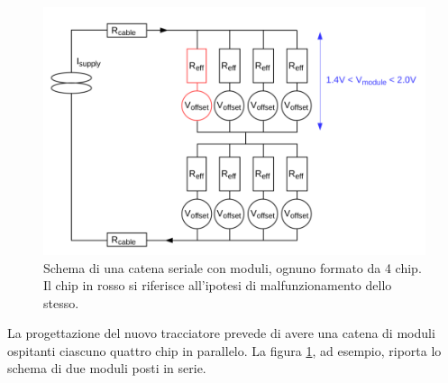 \begin{figure}
\centering
\includegraphics[scale=.3]{Immagini/MultiChipModules}
\caption{Schema di una catena seriale con moduli, ognuno formato da 4 chip. Il chip in rosso si riferisce all'ipotesi di malfunzionamento dello stesso.}
\label{MCM}
\end{figure}

La progettazione del nuovo tracciatore prevede di avere una catena di moduli ospitanti ciascuno quattro chip in parallelo.
La figura \ref{MCM}, ad esempio, riporta lo schema di due moduli posti in serie.

